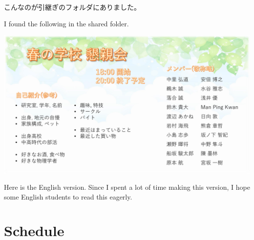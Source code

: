 \documentclass[unicode,a4paper,11pt]{ltjsarticle}
\begin{document}
こんなのが引継ぎのフォルダにありました。

I found the following in the shared folder.

\begin{center}
      \includegraphics[width=1.0\linewidth]{konshinkai.pdf}
\end{center}


\clearpage

\setcounter{section}{0}

Here is the English version. Since I spent a lot of time making this version, I hope some English students to read this eagerly.

\label{eng_page}

\section{Schedule}
\end{document}
